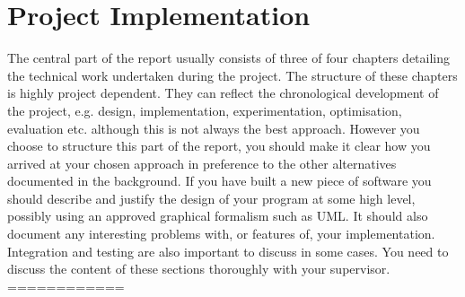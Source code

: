 \documentclass[12pt,twoside]{article}
\begin{document}
\newpage

\section{Project Implementation}

The central part of the report usually consists of three of four chapters detailing the technical work undertaken during the project. The structure of these chapters is highly project dependent. They can reflect the chronological development of the project, e.g. design, implementation, experimentation, optimisation, evaluation etc. although this is not always the best approach. However you choose to structure this part of the report, you should make it clear how you arrived at your chosen approach in preference to the other alternatives documented in the background. If you have built a new piece of software you should describe and justify the design of your program at some high level, possibly using an approved graphical formalism such as UML. It should also document any interesting problems with, or features of, your implementation. Integration and testing are also important to discuss in some cases. You need to discuss the content of these sections thoroughly with your supervisor.\\

============\\
\end{document}
